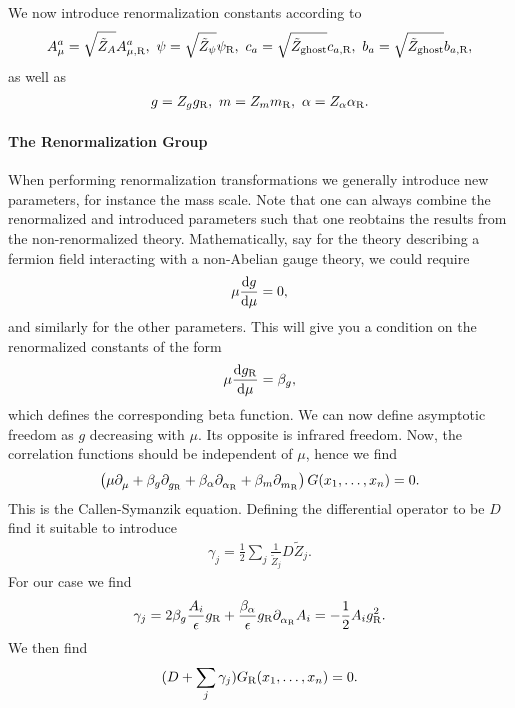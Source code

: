 We now introduce renormalization constants according to
\begin{align*}
	A_{\mu}^{a} = \sqrt{\tilde{Z}_{A}}A_{\mu, \text{R}}^{a},\ \psi = \sqrt{\tilde{Z}_{\psi}}\psi_{\text{R}},\ c_{a} = \sqrt{\tilde{Z}_{\text{ghost}}}c_{a, \text{R}},\ b_{a} = \sqrt{\tilde{Z}_{\text{ghost}}}b_{a, \text{R}},
\end{align*}
as well as 
\begin{align*}
	g = Z_{g}g_{\text{R}},\ m = Z_{m}m_{\text{R}},\ \alpha = Z_{\alpha}\alpha_{\text{R}}.
\end{align*}

\paragraph{The Renormalization Group}
When performing renormalization transformations we generally introduce new parameters, for instance the mass scale. Note that one can always combine the renormalized and introduced parameters such that one reobtains the results from the non-renormalized theory. Mathematically, say for the theory describing a fermion field interacting with a non-Abelian gauge theory, we could require
\begin{align*}
	\mu\dv{g}{\mu} = 0,
\end{align*}
and similarly for the other parameters. This will give you a condition on the renormalized constants of the form
\begin{align*}
	\mu\dv{g_{\ensuremath{\text{R}}}}{\mu} = \beta_{g},
\end{align*}
which defines the corresponding beta function. We can now define asymptotic freedom as $g$ decreasing with $\mu$. Its opposite is infrared freedom. Now, the correlation functions should be independent of $\mu$, hence we find
\begin{align*}
	\left(\mu\partial^{}_{\mu} + \beta_{g}\partial^{}_{g_{\text{R}}} + \beta_{\alpha}\partial^{}_{\alpha_{\text{R}}} + \beta_{m}\partial^{}_{m_{\text{R}}} \right)G(x_{1}, \dots, x_{n}) = 0.
\end{align*}
This is the Callen-Symanzik equation. Defining the differential operator to be $D$ find it suitable to introduce
\begin{align*}
	\gamma_{j} = \frac{1}{2}\sum\limits_{j}\frac{1}{\tilde{Z}_{j}}D\tilde{Z}_{j}.
\end{align*}
For our case we find
\begin{align*}
	\gamma_{j} = 2\beta_{g}\frac{A_{i}}{\epsilon}g_{\text{R}} + \frac{\beta_{\alpha}}{\epsilon}g_{\text{R}}\partial^{}_{\alpha_{\text{R}}}A_{i} = -\frac{1}{2}A_{i}g_{\text{R}}^{2}.
\end{align*}
We then find
\begin{align*}
	(D + \sum\limits_{j}\gamma_{j})G_{\text{R}}(x_{1}, \dots, x_{n}) = 0.
\end{align*}